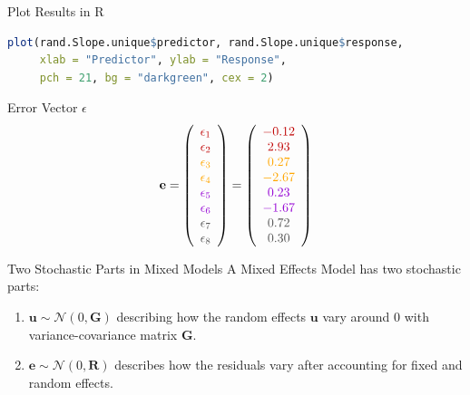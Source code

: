 \documentclass{beamer}
\begin{document}
\begin{frame}[fragile]{Plot Results in R}
\begin{lstlisting}[language=R]
plot(rand.Slope.unique$predictor, rand.Slope.unique$response, 
     xlab = "Predictor", ylab = "Response", 
     pch = 21, bg = "darkgreen", cex = 2)
\end{lstlisting}
\end{frame}


\begin{frame}{Error Vector $\epsilon$}
\[
\mathbf{e} = \left( 
\begin{array}{c} 
\color{darkred}{\epsilon_1} \\ 
\color{darkred}{\epsilon_2} \\ 
\color{orange}{\epsilon_3} \\ 
\color{orange}{\epsilon_4} \\ 
\color{violet}{\epsilon_5} \\ 
\color{violet}{\epsilon_6} \\ 
\color{darkgray}{\epsilon_7} \\ 
\color{darkgray}{\epsilon_8} 
\end{array}\right) = \left( 
\begin{array}{c} 
\color{darkred}{-0.12} \\ 
\color{darkred}{2.93} \\ 
\color{orange}{0.27} \\ 
\color{orange}{-2.67} \\ 
\color{violet}{0.23} \\ 
\color{violet}{-1.67} \\ 
\color{darkgray}{0.72} \\ 
\color{darkgray}{0.30} 
\end{array}\right)
\]
\end{frame}

\begin{frame}{Two Stochastic Parts in Mixed Models}
A Mixed Effects Model has two stochastic parts:
\begin{enumerate}
  \item $\mathbf{u} \sim \mathcal{N}(0, \mathbf{G})$ describing how the random effects $\mathbf{u}$ vary around $0$ with variance-covariance matrix $\mathbf{G}$.
  \item $\mathbf{e} \sim \mathcal{N}(0, \mathbf{R})$ describes how the residuals vary after accounting for fixed and random effects.
\end{enumerate}
\end{frame}
\end{document}

